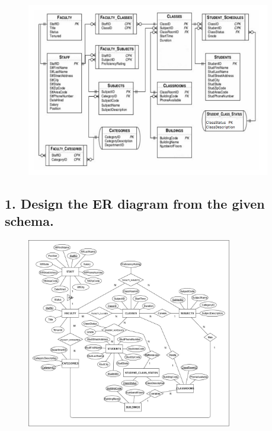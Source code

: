 \documentclass{article}
\begin{document}
\section*{}
\begin{figure}[H]
    \centering
    \includegraphics[width=0.95\textwidth]{cycle1/diagram.png}
    \label{fig:schema}
\end{figure}

\subsection*{1.  Design the ER diagram from the given schema.}
\begin{figure}[H]
    \centering
    \includegraphics[width=0.8\textwidth]{cycle1/ER.jpeg}
    \label{fig:schema}
\end{figure}
\end{document}

